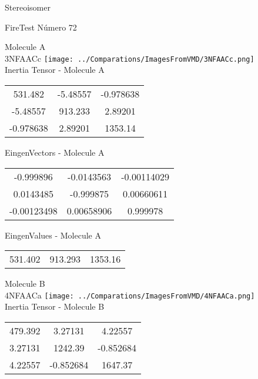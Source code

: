 \begin{center}
\vtab
\vtab
\textcolor{NavyBlue}{\Large Stereoisomer}
\end{center}

 \newpage

\vtab[-2cm]
\begin{center}
{\large FireTest \tab Número 72}
\end{center}
\begin{multicols}{2}
\begin{center}

Molecule A \\ 
3NFAACc
\texttt{[image: ../Comparations/ImagesFromVMD/3NFAACc.png]}
\\
Inertia Tensor - Molecule A \\
\vtab

\begin{tabular}{|c c c|}
531.482	 & 	-5.48557	 & 	-0.978638	 \\
-5.48557	 & 	913.233	 & 	2.89201	 \\
-0.978638	 & 	2.89201	 & 	1353.14
\end{tabular}

\vtab
 EingenVectors - Molecule A     \\
\vtab
\begin{tabular}{|c c c|}
-0.999896	 & 	-0.0143563	 & 	-0.00114029	 \\
0.0143485	 & 	-0.999875	 & 	0.00660611	 \\
-0.00123498	 & 	0.00658906	 & 	0.999978
\end{tabular}

\vtab
 EingenValues - Molecule A     \\
\vtab
\begin{tabular}{|c c c|}
531.402	 & 	913.293	 & 	1353.16	 \\
\end{tabular}
\columnbreak

Molecule B \\ 
4NFAACa
\texttt{[image: ../Comparations/ImagesFromVMD/4NFAACa.png]}
\\
Inertia Tensor - Molecule B \\
\vtab

\begin{tabular}{|c c c|}
479.392	 & 	3.27131	 & 	4.22557	 \\
3.27131	 & 	1242.39	 & 	-0.852684	 \\
4.22557	 & 	-0.852684	 & 	1647.37
\end{tabular}


\end{center}
\end{multicols}
